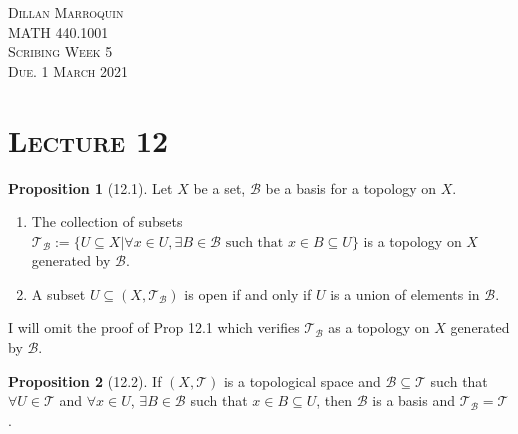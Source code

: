\documentclass{article}
\newcommand{\B}{\ensuremath{\mathcal{B}}}
\newcommand{\Iff}{if and only if}
\newcommand{\ts}{topological space}
\newcommand{\tp}{\ensuremath{\mathcal{T}}}
\newcommand{\Ts}[2]{\ensuremath{(#1,#2)}}
\renewcommand{\Subset}{\subseteq}
\theoremstyle{definition}
\newtheorem*{prop}{Proposition}
\theoremstyle{remark}
\begin{document}
    \begin{center}
        \textsc{Dillan Marroquin\\MATH 440.1001\\Scribing Week 5\\Due. 1 March 2021\\}
    \end{center}
        
    \noindent\section*{\textbf{\textsc{Lecture 12}}}
        \begin{prop}[12.1]
            Let $X$ be a set, $\B$ be a basis for a topology on $X$.
            \begin{enumerate}
                \item The collection of subsets $\tp_\B := \{U \Subset X | \forall x \in U, \exists B \in \B \text{ such that }x \in B \Subset U\}$ is a topology on $X$ generated by $\B$.
                \item A subset $U \Subset \Ts{X}{\tp_\B}$ is open \Iff{} $U$ is a union of elements in $\B$.
            \end{enumerate}
        \end{prop}
        
    I will omit the proof of Prop 12.1 which verifies $\tp_\B$ as a topology on $X$ generated by $\B$.\\
    
    \begin{prop}[12.2]
        If $\Ts{X}{\tp}$ is a \ts{} and $\B \Subset \tp$ such that $\forall U \in \tp$ and $\forall x \in U$, $\exists B \in \B$ such that $x \in B \Subset U$, then $\B$ is a basis and $\tp_\B = \tp$.
    \end{prop}
\end{document}
